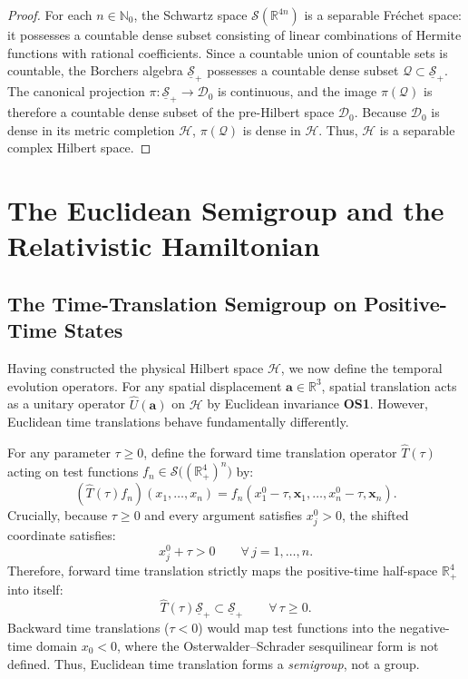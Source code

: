 \begin{proof}
For each $n \in \mathbb{N}_0$, the Schwartz space $\mathcal{S}(\mathbb{R}^{4n})$ is a separable Fr\'echet space: it possesses a countable dense subset consisting of linear combinations of Hermite functions with rational coefficients. Since a countable union of countable sets is countable, the Borchers algebra $\underline{\mathcal{S}}_+$ possesses a countable dense subset $\mathcal{Q} \subset \underline{\mathcal{S}}_+$. The canonical projection $\pi : \underline{\mathcal{S}}_+ \to \mathcal{D}_0$ is continuous, and the image $\pi(\mathcal{Q})$ is therefore a countable dense subset of the pre-Hilbert space $\mathcal{D}_0$. Because $\mathcal{D}_0$ is dense in its metric completion $\mathcal{H}$, $\pi(\mathcal{Q})$ is dense in $\mathcal{H}$. Thus, $\mathcal{H}$ is a separable complex Hilbert space.
\end{proof}

\section{The Euclidean Semigroup and the Relativistic Hamiltonian}
\label{sec:euclidean_semigroup}

\subsection{The Time-Translation Semigroup on Positive-Time States}
\label{subsec:time_translation_semigroup}

Having constructed the physical Hilbert space $\mathcal{H}$, we now define the temporal evolution operators. For any spatial displacement $\mathbf{a} \in \mathbb{R}^3$, spatial translation acts as a unitary operator $\hat{U}(\mathbf{a})$ on $\mathcal{H}$ by Euclidean invariance \textbf{OS1}. However, Euclidean time translations behave fundamentally differently.

For any parameter $\tau \ge 0$, define the forward time translation operator $\hat{T}(\tau)$ acting on test functions $f_n \in \mathcal{S}\bigl( (\mathbb{R}_+^4)^n \bigr)$ by:
\begin{equation}
\label{eq:time_translation_test_def}
(\hat{T}(\tau) f_n)(x_1, \dots, x_n) = f_n(x_1^0 - \tau, \mathbf{x}_1, \dots, x_n^0 - \tau, \mathbf{x}_n).
\end{equation}
Crucially, because $\tau \ge 0$ and every argument satisfies $x_j^0 > 0$, the shifted coordinate satisfies:
\begin{equation}
x_j^0 + \tau > 0 \qquad \forall \, j = 1, \dots, n.
\end{equation}
Therefore, forward time translation strictly maps the positive-time half-space $\mathbb{R}_+^4$ into itself:
\begin{equation}
\label{eq:semigroup_preserves_positive_time}
\hat{T}(\tau) \underline{\mathcal{S}}_+ \subset \underline{\mathcal{S}}_+ \qquad \forall \, \tau \ge 0.
\end{equation}
Backward time translations ($\tau < 0$) would map test functions into the negative-time domain $x_0 < 0$, where the Osterwalder--Schrader sesquilinear form is not defined. Thus, Euclidean time translation forms a \emph{semigroup}, not a group.

